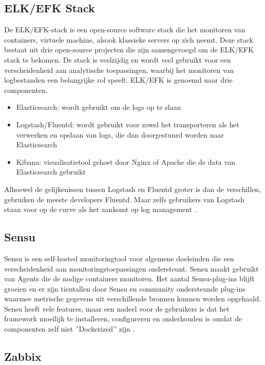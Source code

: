 \subsection{ELK/EFK Stack}

De ELK/EFK-stack is een open-source software stack die het monitoren van containers, virtuele machine, alsook klassieke servers op zich neemt. Deze stack bestaat uit drie open-source projecten die zijn samengevoegd om de ELK/EFK stack te bekomen. De stack is veelzijdig en wordt veel gebruikt voor een verscheidenheid aan analytische toepassingen, waarbij het monitoren van logbestanden een belangrijke rol speelt. ELK/EFK is genoemd naar drie componenten.

\begin{itemize}
    \item Elasticsearch: wordt gebruikt om de logs op te slaan
    \item Logstash/Fluentd: wordt gebruikt voor zowel het transporteren als het verwerken en opslaan van logs, die dan doorgestuurd worden naar Elasticsearch
    \item Kibana: visualisatietool gehost door Nginx of Apache die de data van Elasticsearch gebruikt
\end{itemize}

Alhoewel de gelijkenissen tussen Logstash en Fluentd groter is dan de verschillen, gebruiken de meeste developers Fluentd. Maar zelfs gebruikers van Logstash staan voor op de curve als het aankomt op log management \autocite{Sissons2021}.

\subsection{Sensu}

Sensu is een self-hosted monitoringtool voor algemene doeleinden die een verscheidenheid aan monitoringstoepassingen ondersteunt. Sensu maakt gebruikt van Agents die de nodige containers monitoren. Het aantal Sensu-plug-ins blijft groeien en er zijn tientallen door Sensu en community ondersteunde plug-ins waarmee metrische gegevens uit verschillende bronnen kunnen worden opgehaald. Sensu heeft vele features, maar een nadeel voor de gebruikers is dat het framework moeilijk te installeren, configureren en onderhouden is omdat de componenten zelf niet ''Dockerized'' zijn \autocite{Sissons2021}. 

\subsection{Zabbix}

